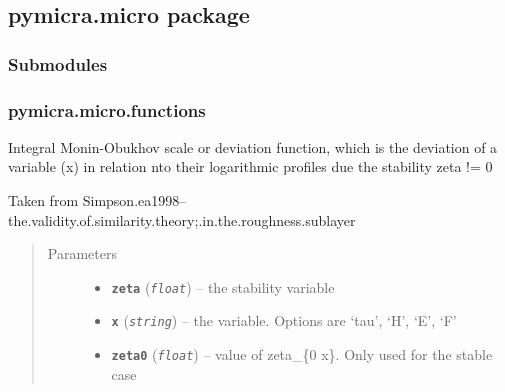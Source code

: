 \documentclass[a4paper,10pt,oneside]{sphinxmanual}
\begin{document}
\subsection{pymicra.micro package}
\label{pymicra.micro:pymicra-micro-package}\label{pymicra.micro::doc}

\subsubsection{Submodules}
\label{pymicra.micro:submodules}

\subsubsection{pymicra.micro.functions}
\label{pymicra.micro:module-pymicra.micro.functions}\label{pymicra.micro:pymicra-micro-functions}

\begin{fulllineitems}
\label{pymicra.micro:pymicra.micro.functions.Psi}
Integral Monin-Obukhov scale or deviation function, which is the deviation of a
variable (x) in relation nto their logarithmic profiles due the stability zeta != 0

Taken from Simpson.ea1998--the.validity.of.similarity.theory;.in.the.roughness.sublayer
\begin{quote}\begin{description}
\item[{Parameters}] \leavevmode\begin{itemize}
\item {} 
\textbf{\texttt{zeta}} (\emph{\texttt{float}}) -- the stability variable

\item {} 
\textbf{\texttt{x}} (\emph{\texttt{string}}) -- the variable. Options are `tau', `H', `E', `F'

\item {} 
\textbf{\texttt{zeta0}} (\emph{\texttt{float}}) -- value of zeta\_\{0 x\}. Only used for the stable case

\end{itemize}

\end{description}\end{quote}

\end{fulllineitems}
\end{document}
